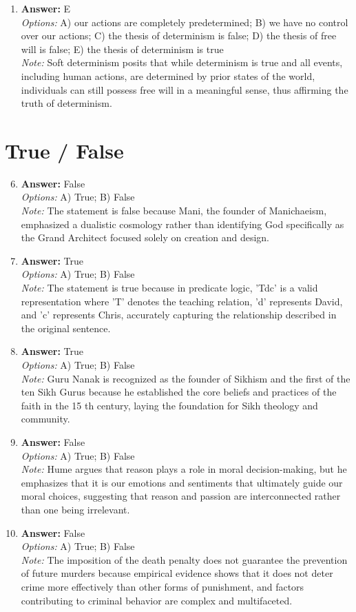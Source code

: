 \documentclass[12pt]{article}
\begin{document}
\begin{enumerate}[label=\arabic*.]
\item \textbf{Answer:} E
\\ \textit{Options:} A) our actions are completely predetermined; B) we have no control over our actions; C) the thesis of determinism is false; D) the thesis of free will is false; E) the thesis of determinism is true
\\ \textit{Note:} Soft determinism posits that while determinism is true and all events, including human actions, are determined by prior states of the world, individuals can still possess free will in a meaningful sense, thus affirming the truth of determinism.
\end{enumerate}

\section*{True / False}
\begin{enumerate}[label=\arabic*.]
\setcounter{enumi}{5}
\item \textbf{Answer:} False
\\ \textit{Options:} A) True; B) False
\\ \textit{Note:} The statement is false because Mani, the founder of Manichaeism, emphasized a dualistic cosmology rather than identifying God specifically as the Grand Architect focused solely on creation and design.
\item \textbf{Answer:} True
\\ \textit{Options:} A) True; B) False
\\ \textit{Note:} The statement is true because in predicate logic, 'Tdc' is a valid representation where 'T' denotes the teaching relation, 'd' represents David, and 'c' represents Chris, accurately capturing the relationship described in the original sentence.
\item \textbf{Answer:} True
\\ \textit{Options:} A) True; B) False
\\ \textit{Note:} Guru Nanak is recognized as the founder of Sikhism and the first of the ten Sikh Gurus because he established the core beliefs and practices of the faith in the 15 th century, laying the foundation for Sikh theology and community.
\item \textbf{Answer:} False
\\ \textit{Options:} A) True; B) False
\\ \textit{Note:} Hume argues that reason plays a role in moral decision-making, but he emphasizes that it is our emotions and sentiments that ultimately guide our moral choices, suggesting that reason and passion are interconnected rather than one being irrelevant.
\item \textbf{Answer:} False
\\ \textit{Options:} A) True; B) False
\\ \textit{Note:} The imposition of the death penalty does not guarantee the prevention of future murders because empirical evidence shows that it does not deter crime more effectively than other forms of punishment, and factors contributing to criminal behavior are complex and multifaceted.
\end{enumerate}
\end{document}

